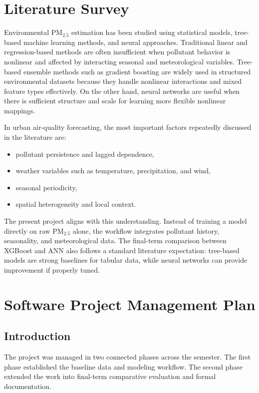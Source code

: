 \documentclass[12pt,a4paper]{report}
\begin{document}
\chapter{Literature Survey}

Environmental PM$_{2.5}$ estimation has been studied using statistical models, tree-based machine learning methods, and neural approaches. Traditional linear and regression-based methods are often insufficient when pollutant behavior is nonlinear and affected by interacting seasonal and meteorological variables. Tree-based ensemble methods such as gradient boosting are widely used in structured environmental datasets because they handle nonlinear interactions and mixed feature types effectively. On the other hand, neural networks are useful when there is sufficient structure and scale for learning more flexible nonlinear mappings.

In urban air-quality forecasting, the most important factors repeatedly discussed in the literature are:

\begin{itemize}[leftmargin=1.3cm]
    \item pollutant persistence and lagged dependence,
    \item weather variables such as temperature, precipitation, and wind,
    \item seasonal periodicity,
    \item spatial heterogeneity and local context.
\end{itemize}

The present project aligns with this understanding. Instead of training a model directly on raw PM$_{2.5}$ alone, the workflow integrates pollutant history, seasonality, and meteorological data. The final-term comparison between XGBoost and ANN also follows a standard literature expectation: tree-based models are strong baselines for tabular data, while neural networks can provide improvement if properly tuned.

\chapter{Software Project Management Plan}

\section{Introduction}
The project was managed in two connected phases across the semester. The first phase established the baseline data and modeling workflow. The second phase extended the work into final-term comparative evaluation and formal documentation.
\end{document}
